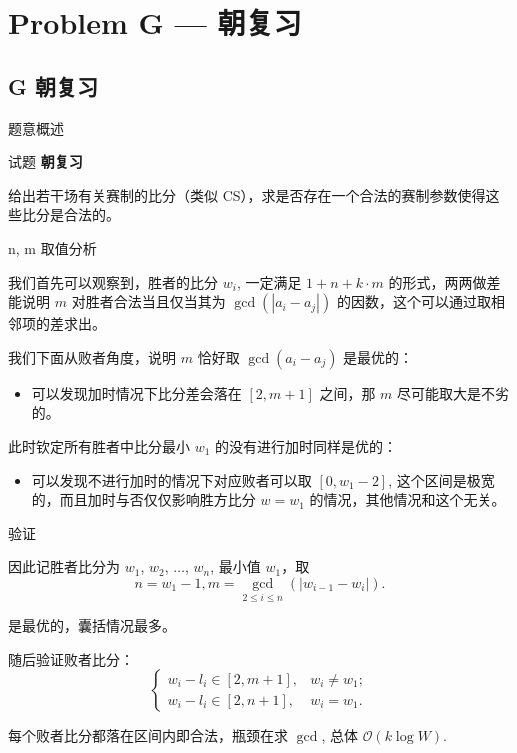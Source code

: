 \documentclass{beamer}
\newcommand{\TT}[1] {{\ttfamily #1}}
\newcommand{\BF}[1] {\textbf{#1}}
\begin{document}
{

\section[G]{Problem G — 朝复习}
\subsection{G 朝复习}

\begin{frame}{题意概述}

\begin{center}
试题 \myboxvii{      \BF{\TT{G}}} \BF{朝复习}
\end{center}

给出若干场有关赛制的比分（类似 CS），求是否存在一个合法的赛制参数使得这些比分是合法的。

\end{frame}


\begin{frame}{n, m 取值分析}

我们首先可以观察到，胜者的比分 $w_i$, 一定满足 $1 + n + k \cdot m$ 的形式，两两做差能说明 $m$ 对胜者合法当且仅当其为 $\gcd(|a_i - a_j|)$ 的因数，这个可以通过取相邻项的差求出。

我们下面从败者角度，说明 $m$ 恰好取 $\gcd(a_i - a_j)$ 是最优的：

\begin{itemize}
  \item 可以发现加时情况下比分差会落在 $[2, m + 1]$ 之间，那 $m$ 尽可能取大是不劣的。
\end{itemize}

此时钦定所有胜者中比分最小 $w_1$ 的没有进行加时同样是优的：
\begin{itemize}
  \item 可以发现不进行加时的情况下对应败者可以取 $[0, w_1 - 2]$, 这个区间是极宽的，而且加时与否仅仅影响胜方比分 $w = w_1$ 的情况，其他情况和这个无关。
\end{itemize}

\end{frame}

\begin{frame}{验证}

因此记胜者比分为 $w_1$, $w_2$, $\ldots$, $w_n$, 最小值 $w_1$，取 \[
  n = w_1 - 1, m = \gcd_{2 \le i \le n}(|w_{i - 1} - w_i|).
\]

是最优的，囊括情况最多。

随后验证败者比分：
\[
  \begin{cases}
    w_i - l_i \in [2, m + 1], &w_i \ne w_1;\\
    w_i - l_i \in [2, n + 1], &w_i = w_1.
  \end{cases}
\]

每个败者比分都落在区间内即合法，瓶颈在求 $\gcd$, 总体 $\mathcal{O}(k \log W)$.

\end{frame}

}
\end{document}
